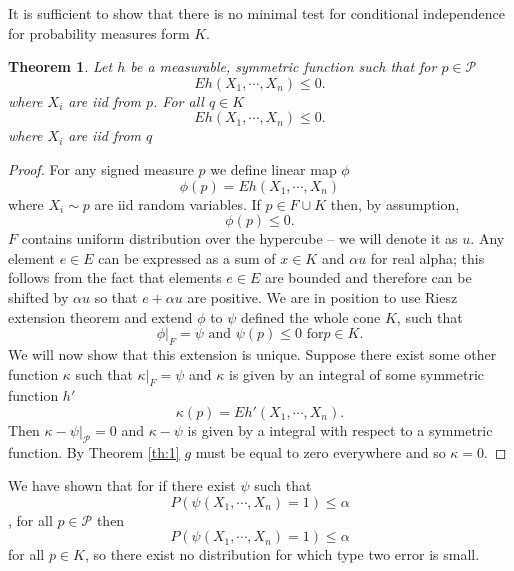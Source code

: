 \documentclass{article}
\newtheorem{Theorem}{Theorem}
\begin{document}
It is sufficient to show that there is no minimal test for conditional independence for probability measures form $K$. 



\begin{Theorem}
 Let $h$ be a measurable, symmetric function such that for $p \in \mathcal P$ 
 \[
 E h(X_1, \cdots , X_n) \leq 0.
\]
where $X_i$ are iid from $p$. For all $q \in K$
\[
 E h(X_1, \cdots , X_n) \leq 0.
\]
where $X_i$ are iid from $q$
\end{Theorem}

\begin{proof}
 
 For any signed measure  $p$ we define linear map $\phi$
 \[
  \phi(p) =  E h(X_1, \cdots , X_n)
 \]
where $X_i \sim p$ are iid random variables. If $p \in F \cup K$ then, by assumption, 
\[
  \phi(p) \leq 0.
\]
$F$ contains uniform distribution over the hypercube -- we will denote it as $u$. Any element  $e \in E$ can be expressed as a sum of $x \in K$ and $\alpha u$ for real alpha; this follows from the fact that elements  $ e \in E$ are bounded and therefore can be shifted by $\alpha u$ so that $e + \alpha u$ are positive. We are in position to use Riesz extension theorem and extend $\phi$ to $\psi$ defined the whole cone $K$, such that 
\[
 \phi |_{F} = \psi \text{ and } \psi(p) \leq 0 \text{ for} p \in K.
\]
We will now show that this extension is unique. Suppose there exist some other function $\kappa$ such that $\kappa |_{F} = \psi$ and $\kappa$ is given by an integral of some symmetric function $h'$
 \[
  \kappa(p) =  E h'(X_1, \cdots , X_n).
 \]
Then $\kappa - \psi |_{\mathcal{P}} = 0$ and $\kappa - \psi$ is given by a integral with respect to a symmetric function. By Theorem \ref{th:1} $g$ must be equal to zero everywhere and so $\kappa =0$.   
\end{proof}

We have shown that for if there exist $\psi$ such that 
$$P(\psi(X_1,\cdots, X_n) = 1) \leq \alpha$$,
for all $p \in \mathcal{P}$ then 
\[
 P(\psi(X_1,\cdots, X_n) = 1) \leq \alpha
\]
for all $p \in K$, so there exist no distribution for which type two error is small.  
\end{document}
